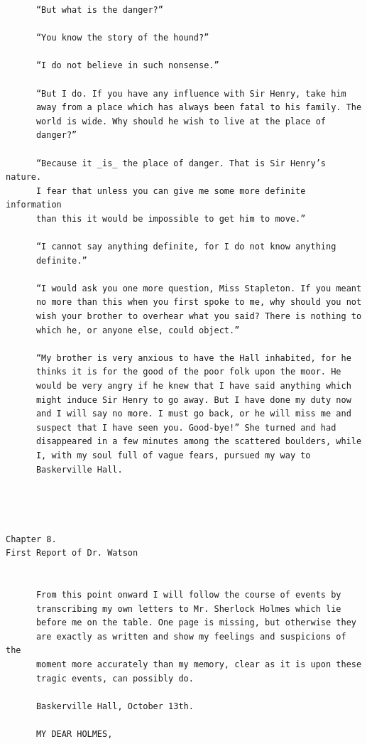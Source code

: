 \documentclass{article}
\begin{document}
\begin{verbatim}
      “But what is the danger?”

      “You know the story of the hound?”

      “I do not believe in such nonsense.”

      “But I do. If you have any influence with Sir Henry, take him
      away from a place which has always been fatal to his family. The
      world is wide. Why should he wish to live at the place of
      danger?”

      “Because it _is_ the place of danger. That is Sir Henry’s nature.
      I fear that unless you can give me some more definite information
      than this it would be impossible to get him to move.”

      “I cannot say anything definite, for I do not know anything
      definite.”

      “I would ask you one more question, Miss Stapleton. If you meant
      no more than this when you first spoke to me, why should you not
      wish your brother to overhear what you said? There is nothing to
      which he, or anyone else, could object.”

      “My brother is very anxious to have the Hall inhabited, for he
      thinks it is for the good of the poor folk upon the moor. He
      would be very angry if he knew that I have said anything which
      might induce Sir Henry to go away. But I have done my duty now
      and I will say no more. I must go back, or he will miss me and
      suspect that I have seen you. Good-bye!” She turned and had
      disappeared in a few minutes among the scattered boulders, while
      I, with my soul full of vague fears, pursued my way to
      Baskerville Hall.




Chapter 8.
First Report of Dr. Watson


      From this point onward I will follow the course of events by
      transcribing my own letters to Mr. Sherlock Holmes which lie
      before me on the table. One page is missing, but otherwise they
      are exactly as written and show my feelings and suspicions of the
      moment more accurately than my memory, clear as it is upon these
      tragic events, can possibly do.

      Baskerville Hall, October 13th.

      MY DEAR HOLMES,


\end{verbatim}
\end{document}
